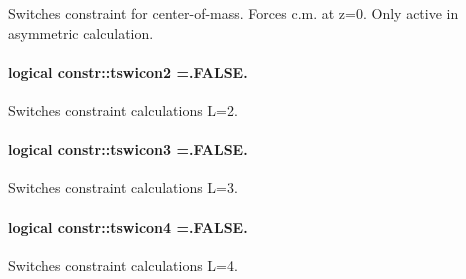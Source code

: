 Switches constraint for center-\/of-\/mass. Forces c.\+m. at z=0. Only active in asymmetric calculation. 

\paragraph[{\texorpdfstring{tswicon2}{tswicon2}}]{\setlength{\rightskip}{0pt plus 5cm}logical constr\+::tswicon2 =.F\+A\+L\+S\+E.}\hypertarget{namespaceconstr_ad4c9b2c5bda593b7630642866cd93358}{}\label{namespaceconstr_ad4c9b2c5bda593b7630642866cd93358}


Switches constraint calculations L=2. 

\paragraph[{\texorpdfstring{tswicon3}{tswicon3}}]{\setlength{\rightskip}{0pt plus 5cm}logical constr\+::tswicon3 =.F\+A\+L\+S\+E.}\hypertarget{namespaceconstr_ae840dc6cddba77231ae81c49cb9dd28f}{}\label{namespaceconstr_ae840dc6cddba77231ae81c49cb9dd28f}


Switches constraint calculations L=3. 

\paragraph[{\texorpdfstring{tswicon4}{tswicon4}}]{\setlength{\rightskip}{0pt plus 5cm}logical constr\+::tswicon4 =.F\+A\+L\+S\+E.}\hypertarget{namespaceconstr_a3625f889e5dc6a042f3200449baa08fd}{}\label{namespaceconstr_a3625f889e5dc6a042f3200449baa08fd}


Switches constraint calculations L=4. 


